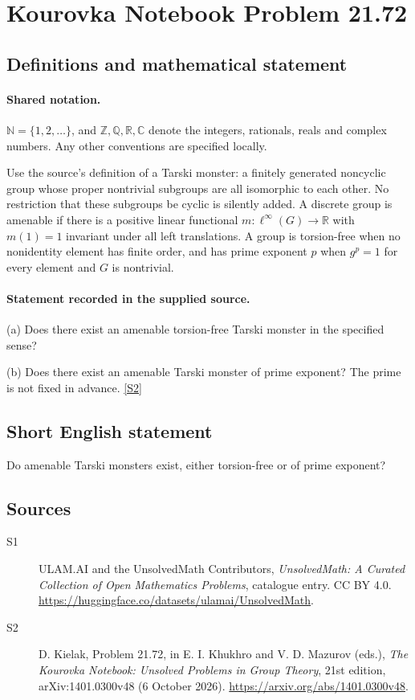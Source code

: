 \documentclass[11pt]{article}
\newcommand{\sref}[2]{\hyperlink{source:#1:#2}{[S#2]}}
\begin{document}
\section{Kourovka Notebook Problem 21.72}\label{statement}

\subsection{Definitions and mathematical statement}

\paragraph{Shared notation.}$\mathbb N=\{1,2,\ldots\}$, and $\mathbb Z,\mathbb Q,\mathbb R,\mathbb C$ denote the integers, rationals, reals and complex numbers. Any other conventions are specified locally.


Use the source's definition of a Tarski monster: a finitely generated noncyclic group whose proper nontrivial subgroups are all isomorphic to each other. No restriction that these subgroups be cyclic is silently added. A discrete group is amenable if there is a positive linear functional $m:\ell^\infty(G)\to\mathbb R$ with $m(1)=1$ invariant under all left translations. A group is torsion-free when no nonidentity element has finite order, and has prime exponent $p$ when $g^p=1$ for every element and $G$ is nontrivial.
\paragraph{Statement recorded in the supplied source.}
(a) Does there exist an amenable torsion-free Tarski monster in the specified sense?

(b) Does there exist an amenable Tarski monster of prime exponent? The prime is not fixed in advance. \sref{statement}{2}
\subsection{Short English statement}
Do amenable Tarski monsters exist, either torsion-free or of prime exponent?
\subsection{Sources}
\begin{description}
\item[\hypertarget{source:statement:1}{S1}] ULAM.AI and the UnsolvedMath Contributors, \emph{UnsolvedMath: A Curated Collection of Open Mathematics Problems}, catalogue entry. CC BY 4.0. \url{https://huggingface.co/datasets/ulamai/UnsolvedMath}.
\item[\hypertarget{source:statement:2}{S2}] D. Kielak, Problem 21.72, in E. I. Khukhro and V. D. Mazurov (eds.), \emph{The Kourovka Notebook: Unsolved Problems in Group Theory}, 21st edition, arXiv:1401.0300v48 (6 October 2026). \url{https://arxiv.org/abs/1401.0300v48}.
\end{description}
\label{end:statement}
\end{document}
